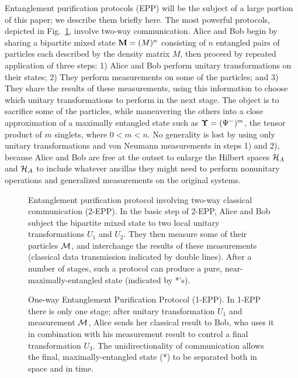 Entanglement purification protocols (EPP) will be the subject of a
large portion of this paper; we describe them briefly here. The most
powerful protocols, depicted in Fig.~\ref{2way}, involve two-way
communication.  Alice and Bob begin by sharing a bipartite mixed state
${\bf M}=(M)^n$ consisting of $n$ entangled pairs of particles each
described by the density matrix $M$, then proceed by repeated
application of three steps: 1) Alice and Bob perform unitary
transformations on their states; 2) They perform measurements on some
of the particles; and 3) They share the results of these measurements,
using this information to choose which unitary transformations to
perform in the next stage. The object is to sacrifice some of the
particles, while maneuvering the others into a close approximation of
a maximally entangled state such as
$\mbox{\boldmath$\Upsilon$}=(\Psi^-)^m$, the tensor product of $m$
singlets, where $0<m<n$.  No generality is lost by using only unitary
transformations and von Neumann measurements in steps 1) and 2), because
Alice and Bob are free at the outset to enlarge the Hilbert spaces
${\cal H}_A$ and ${\cal H}_A$ to include whatever
ancillas they might need to perform nonunitary
operations and generalized measurements on the original systems.
 
\begin{figure}[htbp]
\centerline{}
\caption[Entanglement purification protocol involving two-way
classical communication (2-EPP)]
{Entanglement purification
protocol involving two-way
classical communication (2-EPP).  In the basic step of 2-EPP, Alice
and Bob subject the bipartite mixed state to two local unitary
transformations $U_1$ and $U_2$.  They then measure some of their
particles $\cal M$, and interchange the results of these
measurements (classical data transmission indicated by double lines).
After a number of stages, such a protocol can produce a pure,
near-maximally-entangled state (indicated by *'s).}
\label{2way}
\end{figure}
 
\begin{figure}[htbp]
\centerline{}
\caption[One-way Entanglement Purification Protocol (1-EPP)]{One-way
Entanglement Purification Protocol (1-EPP).  In 1-EPP there is
only one stage; after unitary transformation $U_1$ and
measurement $\cal M$, Alice sends her classical result to Bob,
who uses it in combination with his measurement result to control a
final transformation $U_3$.  The unidirectionality of communication
allows the final, maximally-entangled state (*) to be separated both in
space and in time.}
\label{1way}
\end{figure}
 
